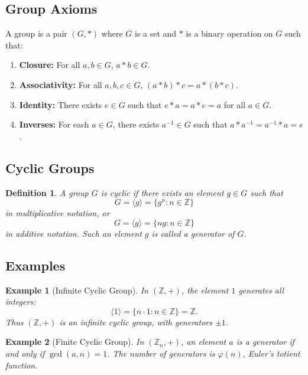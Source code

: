 \documentclass[12pt]{article}
\newtheorem{definition}{Definition}
\newtheorem{example}{Example}
\begin{document}
	\subsection*{Group Axioms}
	
	A group is a pair $(G,*)$ where $G$ is a set and $*$ is a binary operation on $G$ such that:
	
	\begin{enumerate}
		\item \textbf{Closure:} For all $a,b \in G$, $a*b \in G$.
		\item \textbf{Associativity:} For all $a,b,c \in G$, $(a*b)*c = a*(b*c)$.
		\item \textbf{Identity:} There exists $e \in G$ such that $e*a = a*e = a$ for all $a \in G$.
		\item \textbf{Inverses:} For each $a \in G$, there exists $a^{-1} \in G$ such that $a*a^{-1} = a^{-1}*a = e$.
	\end{enumerate}
	
	\subsection*{Cyclic Groups}
	
	\begin{definition}
		A group $G$ is \emph{cyclic} if there exists an element $g \in G$ such that
		$$
		G = \langle g \rangle = \{ g^n : n \in \mathbb{Z} \}
		$$
		in multiplicative notation, or
		$$
		G = \langle g \rangle = \{ n g : n \in \mathbb{Z} \}
		$$
		in additive notation. Such an element $g$ is called a \emph{generator} of $G$.
	\end{definition}
	
	\subsection*{Examples}
	
	\begin{example}[Infinite Cyclic Group]
		In $(\mathbb{Z},+)$, the element $1$ generates all integers:
		$$
		\langle 1 \rangle = \{ n \cdot 1 : n \in \mathbb{Z} \} = \mathbb{Z}.
		$$
		Thus $(\mathbb{Z},+)$ is an infinite cyclic group, with generators $\pm 1$.
	\end{example}
	
	\begin{example}[Finite Cyclic Group]
		In $(\mathbb{Z}_n,+)$, an element $a$ is a generator if and only if $\gcd(a,n)=1$. 
		The number of generators is $\varphi(n)$, Euler's totient function.
	\end{example}
	
\end{document}

